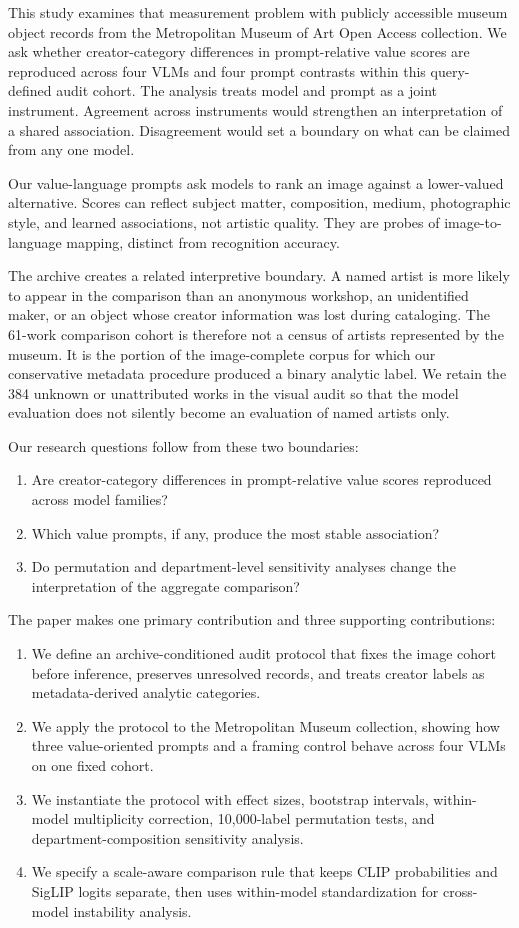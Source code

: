 \documentclass[pdflatex,sn-basic,Numbered]{sn-jnl}
\begin{document}
This study examines that measurement problem with publicly accessible museum object records from the Metropolitan Museum of Art Open Access collection. We ask whether creator-category differences in prompt-relative value scores are reproduced across four VLMs and four prompt contrasts within this query-defined audit cohort. The analysis treats model and prompt as a joint instrument. Agreement across instruments would strengthen an interpretation of a shared association. Disagreement would set a boundary on what can be claimed from any one model.

Our value-language prompts ask models to rank an image against a lower-valued alternative. Scores can reflect subject matter, composition, medium, photographic style, and learned associations, not artistic quality. They are probes of image-to-language mapping, distinct from recognition accuracy.

The archive creates a related interpretive boundary. A named artist is more likely to appear in the comparison than an anonymous workshop, an unidentified maker, or an object whose creator information was lost during cataloging. The 61-work comparison cohort is therefore not a census of artists represented by the museum. It is the portion of the image-complete corpus for which our conservative metadata procedure produced a binary analytic label. We retain the 384 unknown or unattributed works in the visual audit so that the model evaluation does not silently become an evaluation of named artists only.

Our research questions follow from these two boundaries:
\begin{enumerate}
    \item Are creator-category differences in prompt-relative value scores reproduced across model families?
    \item Which value prompts, if any, produce the most stable association?
    \item Do permutation and department-level sensitivity analyses change the interpretation of the aggregate comparison?
\end{enumerate}

The paper makes one primary contribution and three supporting contributions:
    \begin{enumerate}
    \item We define an archive-conditioned audit protocol that fixes the image cohort before inference, preserves unresolved records, and treats creator labels as metadata-derived analytic categories.
    \item We apply the protocol to the Metropolitan Museum collection, showing how three value-oriented prompts and a framing control behave across four VLMs on one fixed cohort.
    \item We instantiate the protocol with effect sizes, bootstrap intervals, within-model multiplicity correction, 10,000-label permutation tests, and department-composition sensitivity analysis.
    \item We specify a scale-aware comparison rule that keeps CLIP probabilities and SigLIP logits separate, then uses within-model standardization for cross-model instability analysis.
    \end{enumerate}
\end{document}
